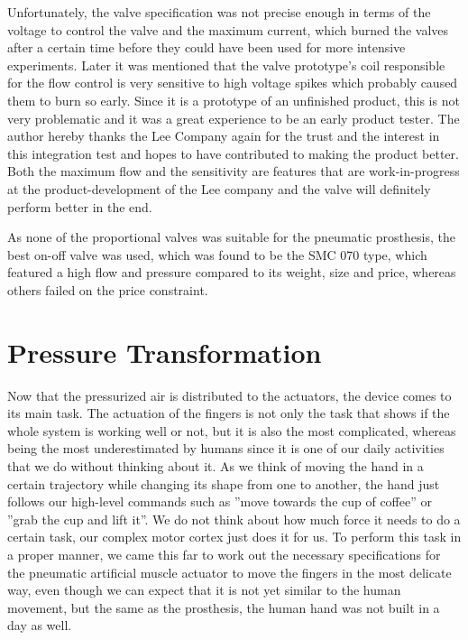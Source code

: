 \documentclass[main]{subfiles}
\begin{document}
Unfortunately, the valve specification was not precise enough in terms of the voltage to control the valve and the maximum current, which burned the valves after a certain time before they could have been used for more intensive experiments. Later it was mentioned that the valve prototype's coil responsible for the flow control is very sensitive to high voltage spikes which probably caused them to burn so early. Since it is a prototype of an unfinished product, this is not very problematic and it was a great experience to be an early product tester. The author hereby thanks the Lee Company again for the trust and the interest in this integration test and hopes to have contributed to making the product better. Both the maximum flow and the sensitivity are features that are work-in-progress at the product-development of the Lee company and the valve will definitely perform better in the end.  


As none of the proportional valves was suitable for the pneumatic prosthesis, the best on-off valve was used, which was found to be the SMC 070 type, which featured a high flow and pressure compared to its weight, size and price, whereas others failed on the price constraint.

\section{Pressure Transformation}

Now that the pressurized air is distributed to the actuators, the device comes to its main task. The actuation of the fingers is not only the task that shows if the whole system is working well or not, but it is also the most complicated, whereas being the most underestimated by humans since it is one of our daily activities that we do without thinking about it. As we think of moving the hand in a certain trajectory while changing its shape from one to another, the hand just follows our high-level commands such as ''move towards the cup of coffee'' or ''grab the cup and lift it''. We do not think about how much force it needs to do a certain task, our complex motor cortex just does it for us. To perform this task in a proper manner, we came this far to work out the necessary specifications for the pneumatic artificial muscle actuator to move the fingers in the most delicate way, even though we can expect that it is not yet similar to the human movement, but the same as the prosthesis, the human hand was not built in a day as well.
\end{document}
